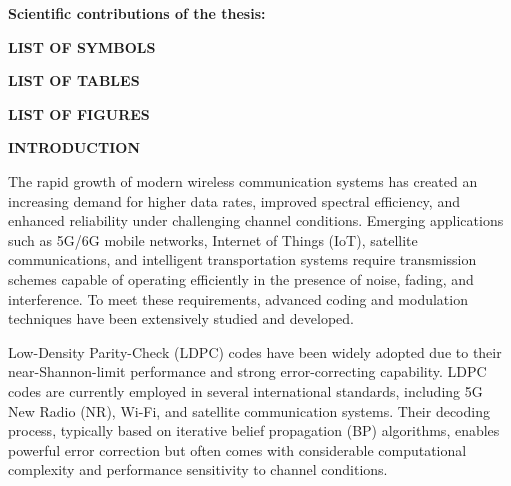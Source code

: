 \documentclass[a4paper,14pt]{extreport}
\begin{document}
\noindent\textbf{Scientific contributions of the thesis:}

\newpage
{}
\begin{center}
    {\Large\textbf{LIST OF SYMBOLS}}
\end{center}


\newpage
\renewcommand{\listtablename}{LIST OF TABLES}
\begin{center}
    {\Large\textbf{LIST OF TABLES}}
\end{center}
\listoftables

\newpage
\renewcommand{\listfigurename}{LIST OF FIGURES}
\begin{center}
    {\Large\textbf{LIST OF FIGURES}}
\end{center}
\listoffigures

\newpage
{}
\setcounter{page}{1}
\begin{center}
    {\Large\textbf{INTRODUCTION}}
\end{center}

The rapid growth of modern wireless communication systems has created an increasing demand for higher data rates, improved spectral efficiency, and enhanced reliability under challenging channel conditions. Emerging applications such as 5G/6G mobile networks, Internet of Things (IoT), satellite communications, and intelligent transportation systems require transmission schemes capable of operating efficiently in the presence of noise, fading, and interference. To meet these requirements, advanced coding and modulation techniques have been extensively studied and developed.

Low-Density Parity-Check (LDPC) codes have been widely adopted due to their near-Shannon-limit performance and strong error-correcting capability. LDPC codes are currently employed in several international standards, including 5G New Radio (NR), Wi-Fi, and satellite communication systems. Their decoding process, typically based on iterative belief propagation (BP) algorithms, enables powerful error correction but often comes with considerable computational complexity and performance sensitivity to channel conditions.
\end{document}
